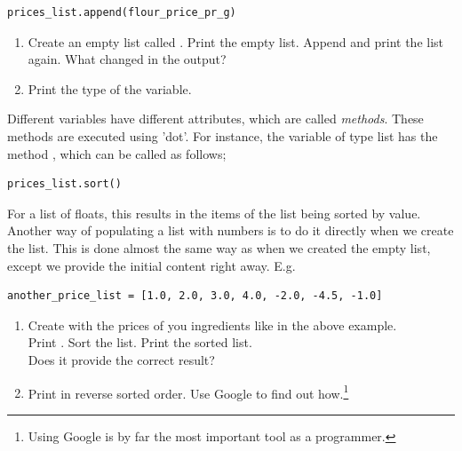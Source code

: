 \documentclass{article}
\begin{document}
\begin{lstlisting}
prices_list.append(flour_price_pr_g)
\end{lstlisting}

\begin{enumerate}[resume]
    \item Create an empty list called .
    Print the empty list.
    Append  and print the list again.
    What changed in the output?

    \item Print the type of the variable.

 \end{enumerate}


Different variables have different attributes, which are called {\em methods}.
These methods are executed using 'dot'.
For instance, the variable of type list has the method , which can be called as follows;

\begin{lstlisting}
prices_list.sort()
\end{lstlisting}

For a list of floats, this results in the items of the list being sorted by value.\\

Another way of populating a list with numbers is to do it directly when we create the list.
This is done almost the same way as when we created the empty list, except we
provide the initial content right away. E.g.

\begin{lstlisting}
another_price_list = [1.0, 2.0, 3.0, 4.0, -2.0, -4.5, -1.0]
\end{lstlisting}

\begin{enumerate}[resume]
    \item Create  with the prices of you ingredients like in the above example.\\
    Print . Sort the list. Print the sorted list. \\
    Does it provide the correct result?

    \item Print  in reverse sorted order.
    Use Google to find out how.\footnote{Using Google is
    by far the most important tool as a programmer.}
\end{enumerate}

\end{document}

